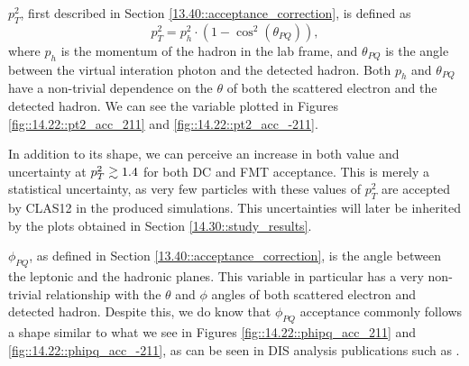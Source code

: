     $p_T^2$, first described in Section \ref{13.40::acceptance_correction}, is defined as
    \begin{equation*}
        p_T^2 = p_h^2 \cdot \left(1 - \cos^2(\theta_{PQ})\right),
    \end{equation*}
    where $p_h$ is the momentum of the hadron in the lab frame, and $\theta_{PQ}$ is the angle between the virtual interation photon and the detected hadron.
    Both $p_h$ and $\theta_{PQ}$ have a non-trivial dependence on the $\theta$ of both the scattered electron and the detected hadron.
    We can see the variable plotted in Figures \ref{fig::14.22::pt2_acc_211} and \ref{fig::14.22::pt2_acc_-211}.

    In addition to its shape, we can perceive an increase in both value and uncertainty at $p_T^2 \gtrsim 1.4$ for both DC and FMT acceptance.
    This is merely a statistical uncertainty, as very few particles with these values of $p_T^2$ are accepted by CLAS12 in the produced simulations.
    This uncertainties will later be inherited by the plots obtained in Section \ref{14.30::study_results}.

    $\phi_{PQ}$, as defined in Section \ref{13.40::acceptance_correction}, is the angle between the leptonic and the hadronic planes.
    This variable in particular has a very non-trivial relationship with the $\theta$ and $\phi$ angles of both scattered electron and detected hadron.
    Despite this, we do know that $\phi_{PQ}$ acceptance commonly follows a shape similar to what we see in Figures \ref{fig::14.22::phipq_acc_211} and \ref{fig::14.22::phipq_acc_-211}, as can be seen in DIS analysis publications such as \cite{moran2022}.

